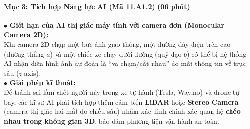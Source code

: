 \documentclass[12pt, a4paper]{article}
\begin{document}
\paragraph{Mục 3: Tích hợp Năng lực AI (Mã 11.A1.2) (06 phút)}

\begin{aibox}
    $\bullet$ \textbf{Giới hạn của AI thị giác máy tính với camera đơn (Monocular Camera 2D):}\\
    Khi camera 2D chụp một bức ảnh giao thông, một đường dây điện trên cao (đường thẳng $a$) và một chiếc xe chạy dưới đường (quỹ đạo $b$) có thể bị hệ thống AI nhận diện hình ảnh dự đoán là ``va chạm/cắt nhau'' do mất thông tin về trục sâu ($z$-axis).\\
    $\bullet$ \textbf{Giải pháp kĩ thuật:}\\
    Để tránh sai lầm chết người này trong xe tự hành (Tesla, Waymo) và drone tự bay, các kĩ sư AI phải tích hợp thêm cảm biến \textbf{LiDAR} hoặc \textbf{Stereo Camera} (camera thị giác hai mắt đo chiều sâu) nhằm xác định chính xác quan hệ \textbf{chéo nhau trong không gian 3D}, bảo đảm phương tiện vận hành an toàn.
\end{aibox}
\end{document}
